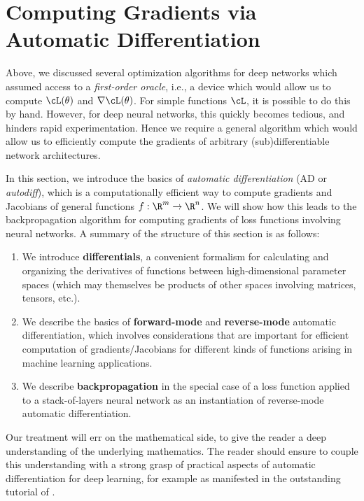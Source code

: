 \documentclass[../../book-main.tex]{subfiles}
\begin{document}
\section{Computing Gradients via Automatic Differentiation}\label{sec:autodiff}

Above, we discussed several optimization algorithms for deep networks
which assumed access to a \textit{first-order oracle}, i.e., a device
which would allow us to compute \(\cL(\theta)\) and \(\nabla
\cL(\theta)\). For simple functions \(\cL\), it is possible to do
this by hand. However, for deep neural networks, this quickly becomes
tedious, and hinders rapid experimentation. Hence we require a
general algorithm which would allow us to efficiently compute the
gradients of arbitrary (sub)differentiable network architectures.

In this section, we introduce the basics of \textit{automatic
differentiation} (AD or \textit{autodiff}), which is a
computationally efficient way to compute gradients and Jacobians of
general functions \(f: \R^{m} \to \R^{n}\). We will show how this
leads to the backpropagation algorithm for computing gradients of
loss functions involving neural networks. A summary of the structure
of this section is as follows:
\begin{enumerate}
    \item We introduce \textbf{differentials}, a convenient formalism
        for calculating and organizing the derivatives of functions
        between high-dimensional parameter spaces (which may
            themselves be products of other spaces involving matrices,
        tensors, etc.).
    \item We describe the basics of \textbf{forward-mode} and
        \textbf{reverse-mode} automatic differentiation, which
        involves considerations that are important for efficient
        computation of gradients/Jacobians for different kinds of
        functions arising in machine learning applications.
    \item We describe \textbf{backpropagation} in the special case of
        a loss function applied to a stack-of-layers neural network
        as an instantiation of reverse-mode automatic differentiation.
\end{enumerate}

Our treatment will err on the mathematical side, to give the reader a
deep understanding of the underlying mathematics. The reader should
ensure to couple this understanding with a strong grasp of practical
aspects of automatic differentiation for deep learning, for example
as manifested in the outstanding tutorial of \textcite{karpathy-micrograd}.
\end{document}
